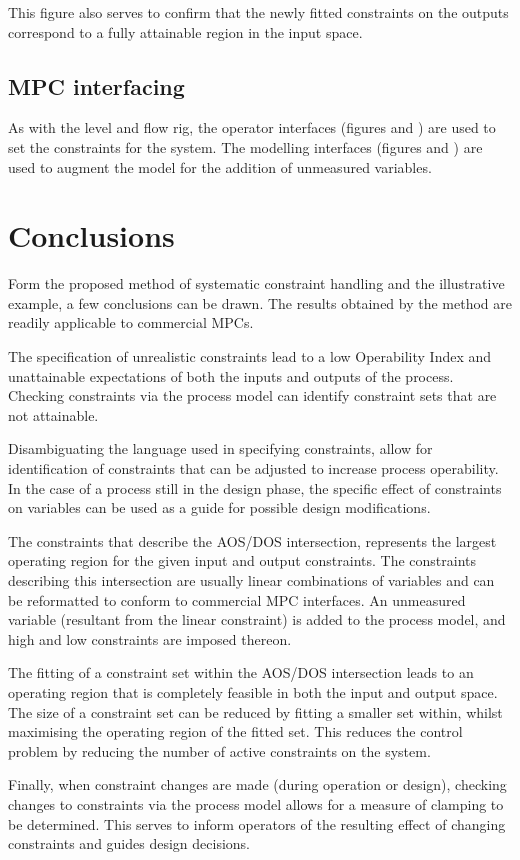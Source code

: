 \documentclass[final,authoryear,5pt,times,twocolumn]{elsarticle}
\begin{document}
This figure also serves to confirm that the newly fitted constraints on the outputs correspond to a fully attainable region in the input space.


\subsection{MPC interfacing}
As with the level and flow rig, the operator interfaces (figures and ) are used to set the constraints for the system.
The modelling interfaces (figures and ) are used to augment the model for the addition of unmeasured variables.


\section{Conclusions}\label{sec:conclusions}
Form the proposed method of systematic constraint handling and the illustrative example, a few conclusions can be drawn.
The results obtained by the method are readily applicable to commercial MPCs.

The specification of unrealistic constraints lead to a low Operability Index and unattainable expectations of both the inputs and outputs of the process.
Checking constraints via the process model can identify constraint sets that are not attainable.

Disambiguating the language used in specifying constraints, allow for identification of constraints that can be adjusted to increase process operability.
In the case of a process still in the design phase, the specific effect of constraints on variables can be used as a guide for possible design modifications. 

The constraints that describe the AOS/DOS intersection, represents the largest operating region for the given input and output constraints.
The constraints describing this intersection are usually linear combinations of variables and can be reformatted to conform to commercial MPC interfaces.
An unmeasured variable (resultant from the linear constraint) is added to the process model, and high and low constraints are imposed thereon.

The fitting of a constraint set within the AOS/DOS intersection leads to an operating region that is completely feasible in both the input and output space.
The size of a constraint set can be reduced by fitting a smaller set within, whilst maximising the operating region of the fitted set.
This reduces the control problem by reducing the number of active constraints on the system.

Finally, when constraint changes are made (during operation or design), checking changes to constraints via the process model allows for a measure of clamping to be determined.
This serves to inform operators of the resulting effect of changing constraints and guides design decisions.




\end{document}
